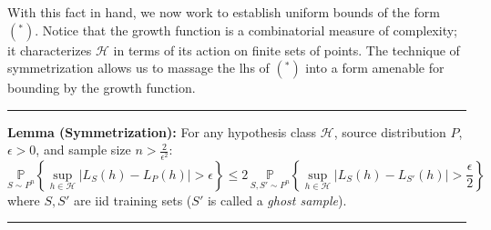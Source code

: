 \documentclass[]{article}
\begin{document}
With this fact in hand, we now work to establish uniform bounds of the
form \((^*)\). Notice that the growth function is a combinatorial
measure of complexity; it characterizes \(\mathcal{H}\) in terms of its
action on finite sets of points. The technique of symmetrization allows
us to massage the lhs of \((^*)\) into a form amenable for bounding by
the growth function.

\begin{center}\rule{0.5\linewidth}{\linethickness}\end{center}

\textbf{Lemma (Symmetrization):} For any hypothesis class
\(\mathcal{H}\), source distribution \(P\), \(\epsilon > 0\), and sample
size \(n > \frac{2}{\epsilon^2}\): \[
\underset{S\sim P^n}{\mathbb{P}} \left\{ \sup_{h\in \mathcal{H}} |L_S(h) - L_P(h)| > \epsilon\right\} \le 2\, 
\underset{S,S'\sim P^n}{\mathbb{P}} \left\{ \sup_{h\in \mathcal{H}} |L_S(h) - L_{S'}(h)| > \frac{\epsilon}{2}\right\}
\] where \(S, S'\) are iid training sets (\(S'\) is called a \emph{ghost
sample}).

\begin{center}\rule{0.5\linewidth}{\linethickness}\end{center}
\end{document}
